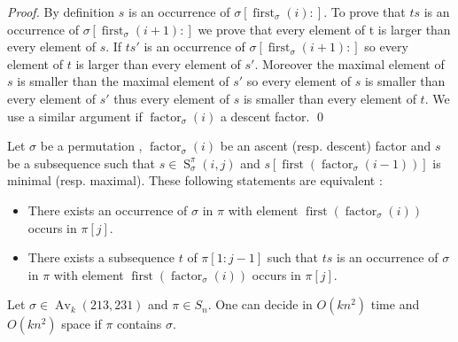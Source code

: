 \documentclass[a4paper]{llncs}
\DeclareMathOperator{\AV}{Av}
\newcommand{\ptext}{\pi}
\newcommand{\pmotif}{\sigma}
\DeclareMathOperator{\firstia}{first}
\newcommand{\firsti}[2]{\firstia_{{#1}}({#2})}
\DeclareMathOperator{\factora}{factor}
\newcommand{\factor}[2]{\factora_{{#1}}({#2})}
\DeclareMathOperator{\firsta}{first}
\newcommand{\first}[2]{\firsta(\factor{#1}{#2})}
\DeclareMathOperator{\SETa}{S}
\newcommand{\SET}[4]{\SETa_{{#1}}^{{#2}}({#3},{#4})}
\begin{document}
\begin{proof}
By definition $s$ is an occurrence of $\pmotif[\firsti{\pmotif}{i}:]$. To prove that $ts$ is an occurrence of $\pmotif[\firsti{\pmotif}{i+1}:]$ we prove that every element of t is larger than every element of $s$. If $ts'$ is an occurrence of $\pmotif[\firsti{\pmotif}{i+1}:]$ so every element of $t$ is larger than every element of $s'$. Moreover the maximal element of $s$ is smaller than  the maximal element of $s'$ so every element of $s$ is smaller than every element of $s'$ thus every element of $s$ is smaller than every element of $t$. We use a similar argument if $\factor{\pmotif}{i}$ a descent factor.
\qed
\end{proof}

\begin{corollary}
Let $\pmotif$ be a permutation , 
$\factor{\pmotif}{i}$ be an ascent (resp. descent) factor
and 
$s$ be a subsequence such that $s \in \SET{\pmotif}{\ptext}{i}{j}$ and $s[\first{\pmotif}{i-1}]$ is minimal (resp. maximal). 
These following statements are equivalent :
\begin{itemize}
	\item There exists an 
	occurrence of $\pmotif$ in $\ptext$ with element $\first{\pmotif}{i}$ occurs in $\ptext[j]$.
	\item There exists a subsequence $t$ of $\ptext[1:j-1]$  such that $ts$ is an occurrence of $\pmotif$ in $\ptext$ with element $\first{\pmotif}{i}$ occurs in $\ptext[j]$. 
\end{itemize}
\end{corollary}


\begin{proposition}
	\label{Proposition:sigma avoids 213 and 231}
	Let $\sigma \in \AV_k(213,231)$ and $\pi \in S_n$.
	One can decide in $O(kn^2)$ time
	and $O(kn^2)$ space if $\pi$ contains $\sigma$.
\end{proposition}

\end{document}

